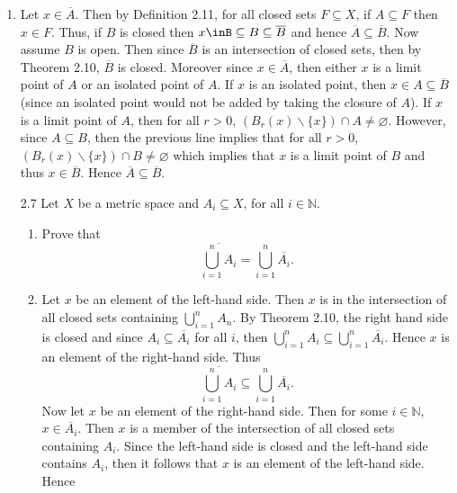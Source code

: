\documentclass[12pt]{article}
\makeatletter
\theoremstyle{definition}
\theoremstyle{remark}
\renewenvironment{proof}[1][\proofname]{\par
  \pushQED{\qed}%
  \normalfont \topsep6\p@\@plus6\p@\relax
  \list{}{\leftmargin=0mm
          \rightmargin=4mm
          \settowidth{\itemindent}{\itshape#1}%
          \labelwidth=\itemindent
          \parsep=0pt \listparindent=\parindent 
  }
  \item[\hskip\labelsep
        \itshape
    #1\@addpunct{.}]\ignorespaces
}{%
  \popQED\endlist\@endpefalse
}
\let\oldproofname=\proofname
\renewcommand{\proofname}{\bf{\textit{\oldproofname}}}
\makeatother
\begin{document}
\begin{enumerate}[leftmargin=*]
                \begin{proof}
                    Let $x\in\overline{A}$. Then by Definition 2.11, for all closed sets $F\subseteq X$, if $A\subseteq F$ then $x\in F$. Thus, if $B$ is closed then $x\inB\subseteq B\subseteq\overline{B}$ and hence $\overline{A}\subseteq\overline{B}$. Now assume $B$ is open. Then since $\overline{B}$ is an intersection of closed sets, then by Theorem 2.10, $\overline{B}$ is closed.  Moreover since $x\in\overline{A}$, then either $x$ is a limit point of $A$ or an isolated point of $A$. If $x$ is an isolated point, then $x\in A\subseteq\overline{B}$ (since an isolated point would not be added by taking the closure of $A$). If $x$ is a limit point of $A$, then for all $r>0$, $(B_r(x)\backslash\{x\})\cap A\neq\varnothing$. However, since $A\subseteq B$, then the previous line implies that for all $r>0$, $(B_r(x)\backslash\{x\})\cap B\neq\varnothing$ which implies that $x$ is a limit point of $B$ and thus $x\in\overline{B}$. Hence $\overline{A}\subseteq\overline{B}$.
                \end{proof}\newpage
            \item[2.7] Let $X$ be a metric space and $A_i\subseteq X$, for all $i\in\mathbb{N}$.
                \begin{enumerate}[label=(\arabic*)]
                    \item Prove that
                        \begin{equation*}
                            \overline{\bigcup_{i=1}^{n}A_i}=\bigcup_{i=1}^{n}\overline{A_i}.
                        \end{equation*}
                        \begin{proof}
                            Let $x$ be an element of the left-hand side. Then $x$ is in the intersection of all closed sets containing $\bigcup_{i=1}^n A_n$. By Theorem 2.10, the right hand side is closed and since $A_i\subseteq\overline{A_i}$ for all $i$, then $\bigcup_{i=1}^n A_i\subseteq\bigcup_{i=1}^n\overline{A_i}$. Hence $x$ is an element of the right-hand side. Thus
                                \begin{equation*}
                                    \overline{\bigcup_{i=1}^{n}A_i}\subseteq\bigcup_{i=1}^{n}\overline{A_i}.
                                \end{equation*}
                            Now let $x$ be an element of the right-hand side. Then for some $i\in\mathbb{N}$, $x\in\overline{A_i}$. Then $x$ is a member of the intersection of all closed sets containing $A_i$. Since the left-hand side is closed and the left-hand side contains $A_i$, then it follows that $x$ is an element of the left-hand side. Hence

\end{proof}
\end{enumerate}
\end{enumerate}
\end{document}
